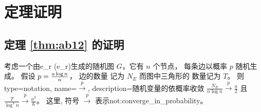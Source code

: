 \section{定理证明}\label{sec:sibm_proof}
\subsection{定理 \ref{thm:ab12} 的证明}
\begin{lemma}\label{lem:ER_tr_counting}
  考虑一个由\gls{e_r} (\glsdesc{e_r})生成的随机图 $G$，它有  $n$
  个节点， 每条边以概率 $p$ 随机生成\cite{erdHos1960evolution}。
   假设
	$p=\frac{a \log n}{n}$， 边的数量
  记为  $N_E$ 
  而图中三角形的
  数量记为  $T$。 则
{
  type=notation,
  name={$\xrightarrow{p}$},
  description={随机变量的依概率收敛}
}
	$\frac{N_E}{n \log n} \xrightarrow{p} \frac{a}{2}$ 且
  $\frac{T}{\log^3 n} \xrightarrow{p} \frac{a^3}{6}$。
  这里, 符号 $\xrightarrow{p}$ 表示\glsdesc{not:converge_in_probability}。
\end{lemma}
